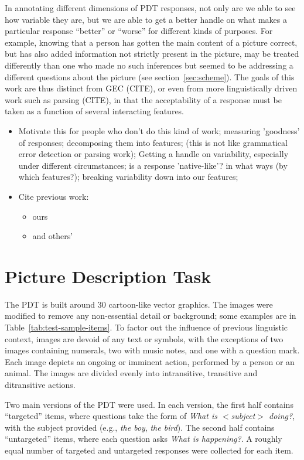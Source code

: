 \documentclass[11pt,a4paper]{article}
\begin{document}
In annotating different dimensions of PDT responses, not only are we
able to see how variable they are, but we are able to get a better
handle on what makes a particular response ``better'' or ``worse'' for
different kinds of purposes.  For example, knowing that a person has
gotten the main content of a picture correct, but has also added
information not strictly present in the picture, may be treated
differently than one who made no such inferences but seemed to be
addressing a different questions about the picture (see section~\ref{sec:scheme}).
The goals of this work are thus distinct from GEC (CITE), or even from
more linguistically driven work such as parsing (CITE), in that the
acceptability of a response must be taken as a function of several
interacting features.

\begin{itemize}
\item Motivate this for people who don't do this kind of work; measuring 'goodness' of responses; decomposing them into features; (this is not like grammatical error detection or parsing work); Getting a handle on variability, especially under different circumstances; is a response 'native-like'? in what ways (by which features?); breaking variability down into our features;
\item Cite previous work:
  \begin{itemize}
  \item ours \citep{king:dickinson:13} 
  \item and others' \citep{somasundaran:ea:15}
  \end{itemize}
\end{itemize}

\section{Picture Description Task}

The PDT is built around 30 cartoon-like vector graphics. The images were modified to remove any non-essential detail or background; some examples are in Table~\ref{tab:test-sample-items}. To factor out the influence of previous linguistic context, images are devoid of any text or symbols, with the exceptions of two images containing numerals, two with music notes, and one with a question mark. Each image depicts an ongoing or imminent action, performed by a person or an animal. The images are divided evenly into intransitive, transitive and ditransitive actions. 

Two main versions of the PDT were used. In each version, the first half contains ``targeted'' items, where questions take the form of \textit{What is $<$subject$>$ doing?}, with the subject provided (e.g., \textit{the boy}, \textit{the bird}). The second half contains ``untargeted'' items, where each question asks \textit{What is happening?}. A roughly equal number of targeted and untargeted responses were collected for each item.
\end{document}

